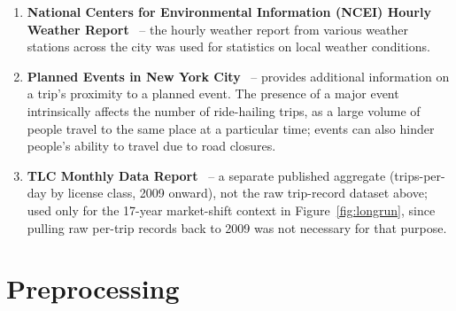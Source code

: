 \documentclass[11pt]{article}
\begin{document}
\begin{enumerate}
    \item \textbf{National Centers for Environmental Information (NCEI) Hourly Weather Report}~\cite{ncei_lcd} --
    the hourly weather report from various weather stations across the city was used for statistics on local weather conditions.

    \item \textbf{Planned Events in New York City}~\cite{nyc_permitted_events} -- provides additional information on a trip's proximity
    to a planned event. The presence of a major event intrinsically affects the number of ride-hailing trips,
    as a large volume of people travel to the same place at a particular time; events can also
    hinder people's ability to travel due to road closures.

    \item \textbf{TLC Monthly Data Report}~\cite{tlc_monthly_report} -- a separate published aggregate (trips-per-day by
    license class, 2009 onward), not the raw trip-record dataset above; used only for the 17-year market-shift context
    in Figure~\ref{fig:longrun}, since pulling raw per-trip records back to 2009 was not necessary for that purpose.
\end{enumerate}



\FloatBarrier
\section{Preprocessing}
\label{sec:preprocessing}
\end{document}
